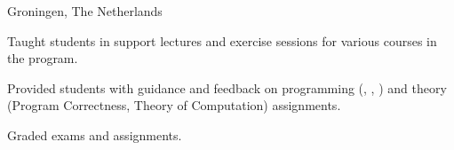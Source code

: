 \begin{cventries}
	{Groningen, The Netherlands}
	{%
		\begin{cvitems}
		\item Taught students in support lectures and exercise sessions for various courses in the program.
		\item Provided students with guidance and feedback on programming (, , ) and theory\\ (Program Correctness, Theory of Computation) assignments.
		\item Graded exams and assignments.
		\end{cvitems}
	}
\end{cventries}
